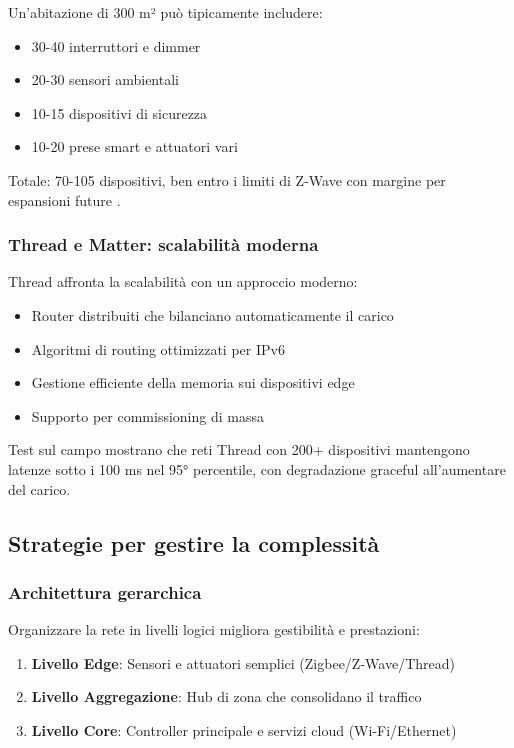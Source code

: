 Un'abitazione di 300 m² può tipicamente includere:
\begin{itemize}
    \item 30-40 interruttori e dimmer
    \item 20-30 sensori ambientali
    \item 10-15 dispositivi di sicurezza
    \item 10-20 prese smart e attuatori vari
\end{itemize}

Totale: 70-105 dispositivi, ben entro i limiti di Z-Wave con margine per espansioni future \cite{ZWaveScalability}.

\subsubsection{Thread e Matter: scalabilità moderna}

Thread affronta la scalabilità con un approccio moderno:

\begin{itemize}
    \item Router distribuiti che bilanciano automaticamente il carico
    \item Algoritmi di routing ottimizzati per IPv6
    \item Gestione efficiente della memoria sui dispositivi edge
    \item Supporto per commissioning di massa
\end{itemize}

Test sul campo mostrano che reti Thread con 200+ dispositivi mantengono latenze sotto i 100 ms nel 95° percentile, con degradazione graceful all'aumentare del carico.

\subsection{Strategie per gestire la complessità}

\subsubsection{Architettura gerarchica}

Organizzare la rete in livelli logici migliora gestibilità e prestazioni:

\begin{enumerate}
    \item \textbf{Livello Edge}: Sensori e attuatori semplici (Zigbee/Z-Wave/Thread)
    \item \textbf{Livello Aggregazione}: Hub di zona che consolidano il traffico
    \item \textbf{Livello Core}: Controller principale e servizi cloud (Wi-Fi/Ethernet)
\end{enumerate}

